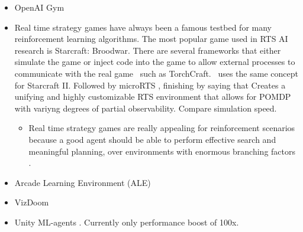 \begin{itemize}
\item OpenAI Gym \citep{Brockman2016}
\item Real time strategy games have always been a famous testbed for many reinforcement learning algorithms. The most popular game used in RTS AI research is Starcraft: Broodwar. There are several frameworks that either simulate the game \citep{Broodwar, Wender2012} or inject code into the game to allow external processes to communicate with the real game~\citep{Synnaeve2016} such as TorchCraft.~\cite{Vinyals2017} uses the same concept for Starcraft II\@. Followed by microRTS \citep{Ontanon2013}, finishing by saying that \citep{Andersen2017} Creates a unifying and highly customizable RTS environment that allows for POMDP with variyng degrees of partial observability. Compare simulation speed.
    \begin{itemize}
    \item Real time strategy games are really appealing for reinforcement scenarios because a good agent should be able to perform effective search and meaningful planning, over environments with enormous branching factors \citep{Soemers2014}\citep{Wender2012}. 
    \end{itemize}
\item Arcade Learning Environment (ALE) \citep{Bellemare2015}
\item VizDoom \citep{Kempka2017}
\item Unity ML-agents \citep{UnityMLAgents}. Currently only performance boost of 100x.
\end{itemize}
